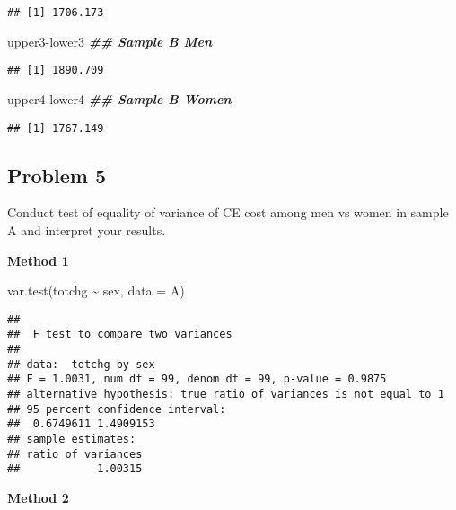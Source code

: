 \documentclass[
]{article}
\newenvironment{Shaded}{\begin{snugshade}}{\end{snugshade}}
\newcommand{\AttributeTok}[1]{\textcolor[rgb]{0.77,0.63,0.00}{#1}}
\newcommand{\DocumentationTok}[1]{\textcolor[rgb]{0.56,0.35,0.01}{\textbf{\textit{#1}}}}
\newcommand{\FunctionTok}[1]{\textcolor[rgb]{0.00,0.00,0.00}{#1}}
\newcommand{\NormalTok}[1]{#1}
\newcommand{\SpecialCharTok}[1]{\textcolor[rgb]{0.00,0.00,0.00}{#1}}
\begin{document}
\begin{verbatim}
## [1] 1706.173
\end{verbatim}

\begin{Shaded}
\begin{Highlighting}[]
\NormalTok{upper3}\SpecialCharTok{{-}}\NormalTok{lower3 }\DocumentationTok{\#\# Sample B Men}
\end{Highlighting}
\end{Shaded}

\begin{verbatim}
## [1] 1890.709
\end{verbatim}

\begin{Shaded}
\begin{Highlighting}[]
\NormalTok{upper4}\SpecialCharTok{{-}}\NormalTok{lower4 }\DocumentationTok{\#\# Sample B Women}
\end{Highlighting}
\end{Shaded}

\begin{verbatim}
## [1] 1767.149
\end{verbatim}

\hypertarget{problem-5}{%
\subsection{Problem 5}\label{problem-5}}

Conduct test of equality of variance of CE cost among men vs women in
sample A and interpret your results.

\textbf{Method 1}

\begin{Shaded}
\begin{Highlighting}[]
\FunctionTok{var.test}\NormalTok{(totchg }\SpecialCharTok{\textasciitilde{}}\NormalTok{ sex, }\AttributeTok{data =}\NormalTok{ A)}
\end{Highlighting}
\end{Shaded}

\begin{verbatim}
## 
##  F test to compare two variances
## 
## data:  totchg by sex
## F = 1.0031, num df = 99, denom df = 99, p-value = 0.9875
## alternative hypothesis: true ratio of variances is not equal to 1
## 95 percent confidence interval:
##  0.6749611 1.4909153
## sample estimates:
## ratio of variances 
##            1.00315
\end{verbatim}

\textbf{Method 2}
\end{document}
